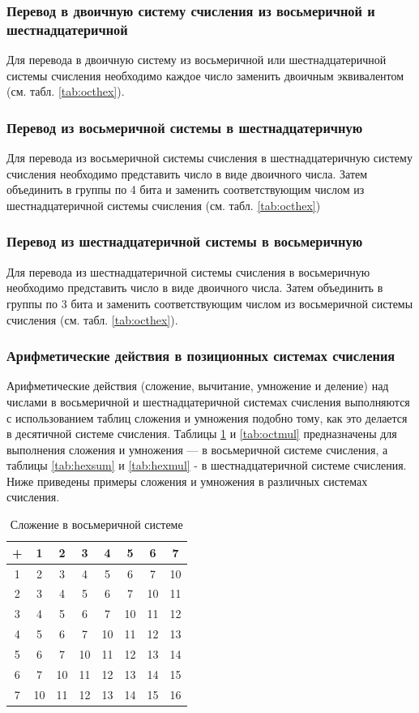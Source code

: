 \subsubsection{Перевод в двоичную систему счисления из восьмеричной и шестнадцатеричной}
Для перевода в двоичную систему из восьмеричной или шестнадцатеричной системы счисления необходимо каждое число заменить двоичным эквивалентом (см. табл. \ref{tab:octhex}).

\subsubsection{Перевод из восьмеричной системы в шестнадцатеричную}
Для перевода из восьмеричной системы счисления в шестнадцатеричную систему счисления необходимо представить число в виде двоичного числа. Затем объединить в группы по 4 бита и заменить соответствующим числом из шестнадцатеричной системы счисления (см. табл. \ref{tab:octhex})

\subsubsection{Перевод из шестнадцатеричной системы в восьмеричную}
Для перевода из шестнадцатеричной системы счисления в восьмеричную необходимо представить число в виде двоичного числа. Затем объединить в группы по 3 бита и заменить соответствующим числом из восьмеричной системы счисления (см. табл. \ref{tab:octhex}).

\subsubsection{Арифметические действия в позиционных системах счисления}
Арифметические действия (сложение, вычитание, умножение и деление) над числами в восьмеричной и шестнадцатеричной системах счисления выполняются с использованием таблиц сложения и умножения подобно тому, как это делается в десятичной системе счисления. Таблицы \ref{tab:octsum} и \ref{tab:octmul} предназначены для выполнения сложения и умножения --- в восьмеричной системе счисления, а таблицы \ref{tab:hexsum} и \ref{tab:hexmul} - в шестнадцатеричной системе счисления. Ниже приведены примеры сложения и умножения в различных системах счисления.

\begin{table}[h]
  \caption{Сложение в восьмеричной системе}
  \begin{center}\label{tab:octsum}
\begin{tabular}{|c|c|c|c|c|c|c|c|}
  \hline
  + & 1 & 2 & 3 & 4 & 5 & 6 & 7\tabularnewline
\hline
1 & 2 & 3 & 4 & 5 & 6 & 7 & 10\tabularnewline
\hline
2 & 3 & 4 & 5 & 6 & 7 & 10 & 11\tabularnewline
\hline
3 & 4 & 5 & 6 & 7 & 10 & 11 & 12\tabularnewline
\hline
4 & 5 & 6 & 7 & 10 & 11 & 12 & 13\tabularnewline
\hline
5 & 6 & 7 & 10 & 11 & 12 & 13 & 14\tabularnewline
\hline
6 & 7 & 10 & 11 & 12 & 13 & 14 & 15\tabularnewline
\hline
7 & 10 & 11 & 12 & 13 & 14 & 15 & 16\tabularnewline
                                  \hline
\end{tabular}
\end{center}
\end{table}

